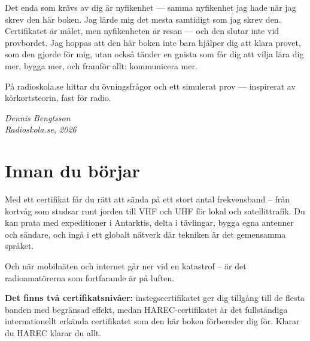 \documentclass[a4paper,11pt,twoside]{book}
\newcommand{\etitle}[2]{{\emojifont\mdseries #1}\space #2}
\begin{document}
\vspace{4mm}

Det enda som krävs av dig är nyfikenhet — samma nyfikenhet jag hade när jag skrev den här boken. Jag lärde mig det mesta samtidigt som jag skrev den. Certifikatet är målet, men nyfikenheten är resan — och den slutar inte vid provbordet. Jag hoppas att den här boken inte bara hjälper dig att klara provet, som den gjorde för mig, utan också tänder en gnista som får dig att vilja lära dig mer, bygga mer, och framför allt: kommunicera mer.

\vspace{4mm}

På radioskola.se hittar du övningsfrågor och ett simulerat prov — inspirerat av körkortsteorin, fast för radio.

\vspace{6mm}


{\raggedleft\itshape Dennis Bengtsson\\Radioskola.se, 2026\par}

\chapter*{Innan du börjar}

\begin{orangebox}[title={\etitle{📻}{Vad väntar dig som radioamatör?}}]
Med ett certifikat får du rätt att sända på ett stort antal frekvensband – från kortvåg som studsar runt jorden till VHF och UHF för lokal och satellittrafik. Du kan prata med expeditioner i Antarktis, delta i tävlingar, bygga egna antenner och sändare, och ingå i ett globalt nätverk där tekniken är det gemensamma språket.

Och när mobilnäten och internet går ner vid en katastrof – är det radioamatörerna som fortfarande är på luften.

\textbf{Det finns två certifikatsnivåer:} instegscertifikatet ger dig tillgång till de flesta banden med begränsad effekt, medan HAREC-certifikatet är det fullständiga internationellt erkända certifikatet som den här boken förbereder dig för. Klarar du HAREC klarar du allt.
\end{orangebox}
\end{document}
